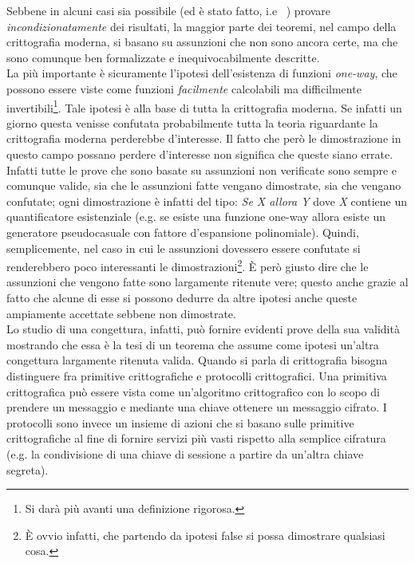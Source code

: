 \documentclass[a4paper,openright,twoside,12pt]{report}
\begin{document}
Sebbene in alcuni casi sia possibile (ed \`e stato fatto, i.e ~\cite{Shannon}) provare \emph{incondizionatamente} dei risultati, la maggior parte dei teoremi, nel campo 
della crittografia moderna, si basano su assunzioni che non sono ancora certe, ma che sono comunque ben formalizzate e inequivocabilmente descritte.\\La pi\`u importante \`e sicuramente
l'ipotesi dell'esistenza di funzioni \emph{one-way}, che possono essere viste come funzioni \emph{facilmente} calcolabili
 ma difficilmente invertibili\footnote{Si dar\`a pi\`u avanti una definizione rigorosa.}. 
Tale ipotesi \`e alla base di tutta la crittografia moderna. Se infatti un giorno questa venisse confutata probabilmente
tutta la teoria riguardante la crittografia moderna perderebbe d'interesse. Il fatto che per\`o le dimostrazione in questo campo possano perdere d'interesse
non significa che queste siano errate. Infatti tutte le prove che sono basate su assunzioni non verificate sono sempre e comunque valide, sia che le assunzioni fatte vengano dimostrate,
sia che vengano confutate; ogni dimostrazione \`e infatti del tipo: \emph{Se X allora Y} dove \emph{X} contiene un quantificatore esistenziale (e.g. se esiste una funzione one-way allora esiste un generatore pseudocasuale con fattore
d'espansione polinomiale). Quindi, semplicemente, nel caso in cui le assunzioni dovessero essere confutate si renderebbero poco interessanti le dimostrazioni\footnote{\`E ovvio infatti, che partendo da ipotesi false si possa
dimostrare qualsiasi cosa.}.
\`E per\`o giusto dire che le assunzioni che vengono fatte sono largamente ritenute vere; questo anche  grazie al fatto che alcune di esse si possono dedurre da altre ipotesi 
anche queste ampiamente accettate sebbene non dimostrate.\\Lo studio di una congettura, infatti, pu\`o fornire evidenti prove della sua validit\`a mostrando che essa \`e la tesi di un teorema che assume come ipotesi
un'altra congettura largamente ritenuta valida.
Quando si parla di crittografia bisogna distinguere fra primitive crittografiche e protocolli crittografici.
Una primitiva crittografica pu\`o essere vista come un'algoritmo crittografico con lo scopo 
di prendere un messaggio e mediante una chiave ottenere un messaggio cifrato. 
I protocolli sono invece un insieme di azioni che si basano sulle primitive crittografiche al fine di fornire
servizi pi\`u vasti rispetto alla semplice cifratura (e.g. la condivisione di una chiave di sessione a partire
da un'altra chiave segreta).
\end{document}
